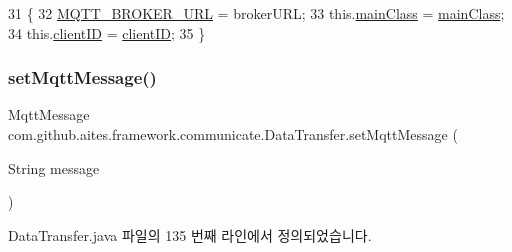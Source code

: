 \begin{DoxyCode}
31                                                                                      \{
32         \mbox{\hyperlink{classcom_1_1github_1_1aites_1_1framework_1_1communicate_1_1_data_transfer_a379ab24ad1b3894585dc42b93a1ab612}{MQTT\_BROKER\_URL}} = brokerURL;
33         this.\mbox{\hyperlink{classcom_1_1github_1_1aites_1_1framework_1_1communicate_1_1_data_transfer_aaf2d39cfff3efab5f33efb759918a3fe}{mainClass}} = \mbox{\hyperlink{classcom_1_1github_1_1aites_1_1framework_1_1communicate_1_1_data_transfer_aaf2d39cfff3efab5f33efb759918a3fe}{mainClass}};
34         this.\mbox{\hyperlink{classcom_1_1github_1_1aites_1_1framework_1_1communicate_1_1_data_transfer_a5aa04d84db8a69443856393e4fcaa941}{clientID}} = \mbox{\hyperlink{classcom_1_1github_1_1aites_1_1framework_1_1communicate_1_1_data_transfer_a5aa04d84db8a69443856393e4fcaa941}{clientID}};
35     \}
\end{DoxyCode}
\mbox{\label{classcom_1_1github_1_1aites_1_1framework_1_1communicate_1_1_data_transfer_a16f821387f67b2cbe407162b318f0023}} 
\subsubsection{\texorpdfstring{set\+Mqtt\+Message()}{setMqttMessage()}}
{\footnotesize\ttfamily Mqtt\+Message com.\+github.\+aites.\+framework.\+communicate.\+Data\+Transfer.\+set\+Mqtt\+Message (\begin{DoxyParamCaption}\item[{String}]{message }\end{DoxyParamCaption})\hspace{0.3cm}{\ttfamily [private]}}



Data\+Transfer.\+java 파일의 135 번째 라인에서 정의되었습니다.


